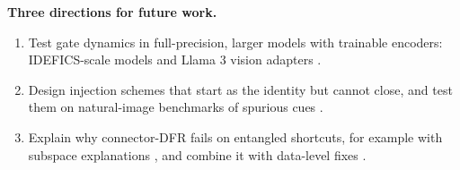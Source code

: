 \textbf{Three directions for future work.}

\begin{enumerate}
\def\labelenumi{\arabic{enumi}.}
\item
  Test gate dynamics in full-precision, larger models with trainable encoders: IDEFICS-scale models and
  Llama 3 vision adapters \cite{grattafiori2024llama3}.
\item
  Design injection schemes that start as the identity but cannot close, and test them on natural-image
  benchmarks of spurious cues \cite{yang2025spuriverse,hosseini2025spurlens}.
\item
  Explain why connector-DFR fails on entangled shortcuts, for example with subspace explanations
  \cite{chormai2024disentangled}, and combine it with data-level fixes \cite{noohdani2024decompose}.
\end{enumerate}
